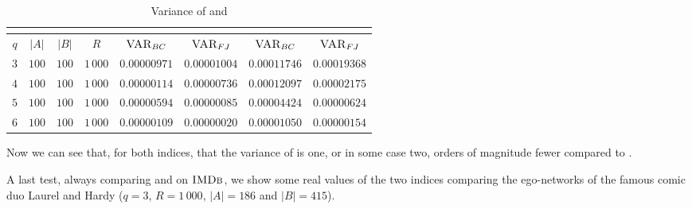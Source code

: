 		\begin{table}[h]
			\centering
			\label{my-label}
			\begin{tabular}{|c|c|c|c|c|c|c|c|}
				\cline{5-8}
				\multicolumn{4}{c|}{} & \multicolumn{2}{c|}{\fsamp} & \multicolumn{2}{c|}{\base}\\
				\hline
				$q$ & $|A|$ & $|B|$ & $R$        & $\textsc{VAR}_{BC}$ & $\textsc{VAR}_{FJ}$ & $\textsc{VAR}_{BC}$ & $\textsc{VAR}_{FJ}$\\ \hline 
				$3$ & $100$ & $100$ & $1\,000$   & $0.00000971$ & $0.00001004$ & $0.00011746$ & $0.00019368$ \\ \hline
				$4$ & $100$ & $100$ & $1\,000$   & $0.00000114$ & $0.00000736$ & $0.00012097$ & $0.00002175$ \\ \hline
				$5$ & $100$ & $100$ & $1\,000$   & $0.00000594$ & $0.00000085$ & $0.00004424$ & $0.00000624$ \\ \hline
				$6$ & $100$ & $100$ & $1\,000$   & $0.00000109$ & $0.00000020$ & $0.00001050$ & $0.00000154$ \\ \hline
			\end{tabular}
			\caption{Variance of \fsamp and \base}	
		\end{table}
	
		Now we can see that, for both indices, that the variance of \fsamp is one, or in some case two, orders of magnitude fewer compared to \base.
		
		A last test, always comparing \fsamp and \base on $\textsc{IMDb}$, we show some real values of the two indices comparing the ego-networks of the famous comic duo Laurel and Hardy
		($q=3$, $R=1\,000$, $|A| = 186$ and $|B| = 415$).
		
